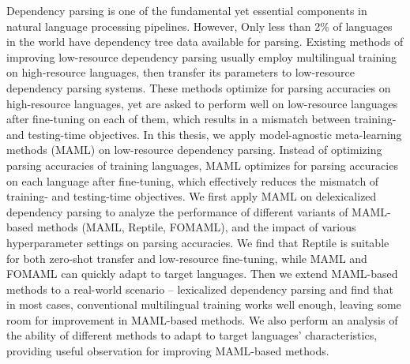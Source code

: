 \begin{enAbstract}
    Dependency parsing is one of the fundamental yet essential components in natural language processing pipelines.
    However, Only less than 2\% of languages in the world have dependency tree data available for parsing.
    Existing methods of improving low-resource dependency parsing usually employ multilingual training on high-resource languages, then transfer its parameters to low-resource dependency parsing systems.
    These methods optimize for parsing accuracies on high-resource languages, yet are asked to perform well on low-resource languages after fine-tuning on each of them, which results in a mismatch between training- and testing-time objectives.
    In this thesis, we apply model-agnostic meta-learning methods (MAML) on low-resource dependency parsing.
    Instead of optimizing parsing accuracies of training languages,
    MAML optimizes for parsing accuracies on each language after fine-tuning,
    which effectively reduces the mismatch of training- and testing-time objectives.
    We first apply MAML on delexicalized dependency parsing to analyze the performance of different variants of MAML-based methods (MAML, Reptile, FOMAML),
    and the impact of various hyperparameter settings on parsing accuracies.
    We find that Reptile is suitable for both zero-shot transfer and low-resource fine-tuning, while MAML and FOMAML can quickly adapt to target languages.
    Then we extend MAML-based methods to a real-world scenario -- lexicalized dependency parsing and find that in most cases, conventional multilingual training works well enough, leaving some room for improvement in MAML-based methods.
    We also perform an analysis of the ability of different methods to adapt to target languages' characteristics, providing useful observation for improving MAML-based methods.

\end{enAbstract}

{
\mysinglespacing\selectfont
\tableofcontents %

\listoffigures  %

\listoftables  %
\par
}

\newpage
\setcounter{page}{1}
